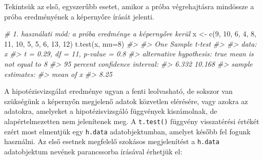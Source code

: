 \documentclass[
]{book}
\newenvironment{Shaded}{\begin{snugshade}}{\end{snugshade}}
\newcommand{\AttributeTok}[1]{\textcolor[rgb]{0.77,0.63,0.00}{#1}}
\newcommand{\CommentTok}[1]{\textcolor[rgb]{0.56,0.35,0.01}{\textit{#1}}}
\newcommand{\DecValTok}[1]{\textcolor[rgb]{0.00,0.00,0.81}{#1}}
\newcommand{\FunctionTok}[1]{\textcolor[rgb]{0.00,0.00,0.00}{#1}}
\newcommand{\NormalTok}[1]{#1}
\newcommand{\OtherTok}[1]{\textcolor[rgb]{0.56,0.35,0.01}{#1}}
\begin{document}
Tekintsük az első, egyszerűbb esetet, amikor a próba végrehajtásra mindössze a próba eredményének a képernyőre írását jelenti.

\begin{Shaded}
\begin{Highlighting}[]
\CommentTok{\# 1. használati mód: a próba eredménye a képernyőre kerül}
\NormalTok{x }\OtherTok{\textless{}{-}} \FunctionTok{c}\NormalTok{(}\DecValTok{9}\NormalTok{, }\DecValTok{10}\NormalTok{, }\DecValTok{6}\NormalTok{, }\DecValTok{4}\NormalTok{, }\DecValTok{8}\NormalTok{, }\DecValTok{11}\NormalTok{, }\DecValTok{10}\NormalTok{, }\DecValTok{5}\NormalTok{, }\DecValTok{5}\NormalTok{, }\DecValTok{6}\NormalTok{, }\DecValTok{13}\NormalTok{, }\DecValTok{12}\NormalTok{)}
\FunctionTok{t.test}\NormalTok{(x, }\AttributeTok{mu=}\DecValTok{8}\NormalTok{)  }
\CommentTok{\#\textgreater{} }
\CommentTok{\#\textgreater{}  One Sample t{-}test}
\CommentTok{\#\textgreater{} }
\CommentTok{\#\textgreater{} data:  x}
\CommentTok{\#\textgreater{} t = 0.29, df = 11, p{-}value = 0.8}
\CommentTok{\#\textgreater{} alternative hypothesis: true mean is not equal to 8}
\CommentTok{\#\textgreater{} 95 percent confidence interval:}
\CommentTok{\#\textgreater{}   6.332 10.168}
\CommentTok{\#\textgreater{} sample estimates:}
\CommentTok{\#\textgreater{} mean of x }
\CommentTok{\#\textgreater{}      8.25}
\end{Highlighting}
\end{Shaded}

A hipotézisvizsgálat eredménye ugyan a fenti leolvasható, de sokszor van szükségünk a képernyőn megjelenő adatok közvetlen elérésére, vagy azokra az adatokra, amelyeket a hipotézisvizsgáló függvények kiszámolnak, de alapértelmezetten nem jelenítenek meg. A \texttt{t.test()} függvény visszatérési értékét ezért most elmentjük egy \texttt{h.data} adatobjektumban, amelyet később fel fogunk használni. Az első esetnek megfelelő szokásos megjelenítést a \texttt{h.data} adatobjektum nevének parancssorba írásával érhetjük el:
\end{document}
